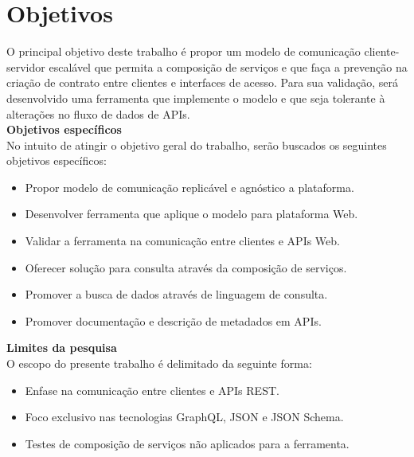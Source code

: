 \section[Objetivos]{Objetivos}

O principal objetivo deste trabalho é propor um modelo de comunicação cliente-servidor escalável que permita a composição de serviços e que faça a prevenção na criação de contrato entre clientes e interfaces de acesso. Para sua validação, será desenvolvido uma ferramenta que implemente o modelo e que seja tolerante à alterações no fluxo de dados de APIs. \\

\textbf{Objetivos específicos} \\

No intuito de atingir o objetivo geral do trabalho, serão buscados os seguintes objetivos específicos:

\begin{itemize}
\item Propor modelo de comunicação replicável e agnóstico a plataforma.
\item Desenvolver ferramenta que aplique o modelo para plataforma Web.
\item Validar a ferramenta na comunicação entre clientes e APIs Web.
\item Oferecer solução para consulta através da composição de serviços.
\item Promover a busca de dados através de linguagem de consulta.
\item Promover documentação e descrição de metadados em APIs. \\
\end{itemize}

\textbf{Limites da pesquisa} \\

O escopo do presente trabalho é delimitado da seguinte forma:

\begin{itemize}
\item Enfase na comunicação entre clientes e APIs REST.
\item Foco exclusivo nas tecnologias GraphQL, JSON e JSON Schema.
\item Testes de composição de serviços não aplicados para a ferramenta.
\end{itemize}

